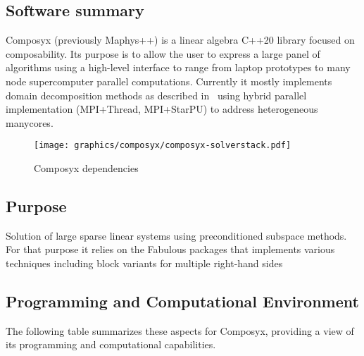 \subsection{Software summary}
\label{sec:Composyx:summary}
Composyx (previously  Maphys++) is a linear algebra C++20 library focused on composability. Its purpose is to allow the user to express a large panel of algorithms using a high-level interface to range from laptop prototypes to many node supercomputer parallel computations.
Currently it mostly implements domain decomposition methods as described in~\cite{agullo_robust_2019} using hybrid parallel implementation (MPI+Thread, MPI+StarPU) to address heterogeneous manycores.

\begin{figure}
        \centering
        \texttt{[image: graphics/composyx/composyx-solverstack.pdf]}
        \caption{Composyx dependencies}
        \label{fig:composyx}
    \end{figure}

\subsection{Purpose}
\label{sec:Composyx:purpose}
Solution of large sparse linear systems using preconditioned subspace methods. For that purpose it relies on the Fabulous packages that implements various techniques including block variants for multiple right-hand sides~\cite{giraud_block_2022}

\subsection{Programming and Computational Environment}
\label{sec::Composyx:environment_capabilities}


The following table summarizes these aspects for Composyx, providing a  view of its programming and computational capabilities.

